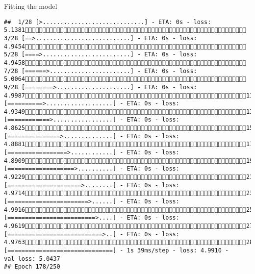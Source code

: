 \documentclass[
  ignorenonframetext,
]{beamer}
\begin{document}
\begin{frame}[fragile]{Fitting the model}
\begin{verbatim}
##  1/28 [>.............................] - ETA: 0s - loss: 5.1381 3/28 [==>...........................] - ETA: 0s - loss: 4.9454 5/28 [====>.........................] - ETA: 0s - loss: 4.9458 7/28 [======>.......................] - ETA: 0s - loss: 5.0064 9/28 [========>.....................] - ETA: 0s - loss: 4.998711/28 [==========>...................] - ETA: 0s - loss: 4.934913/28 [============>.................] - ETA: 0s - loss: 4.862515/28 [===============>..............] - ETA: 0s - loss: 4.888117/28 [=================>............] - ETA: 0s - loss: 4.890919/28 [===================>..........] - ETA: 0s - loss: 4.922921/28 [=====================>........] - ETA: 0s - loss: 4.971423/28 [=======================>......] - ETA: 0s - loss: 4.991625/28 [=========================>....] - ETA: 0s - loss: 4.961927/28 [===========================>..] - ETA: 0s - loss: 4.976328/28 [==============================] - 1s 39ms/step - loss: 4.9910 - val_loss: 5.0437
## Epoch 178/250

\end{verbatim}
\end{frame}
\end{document}
